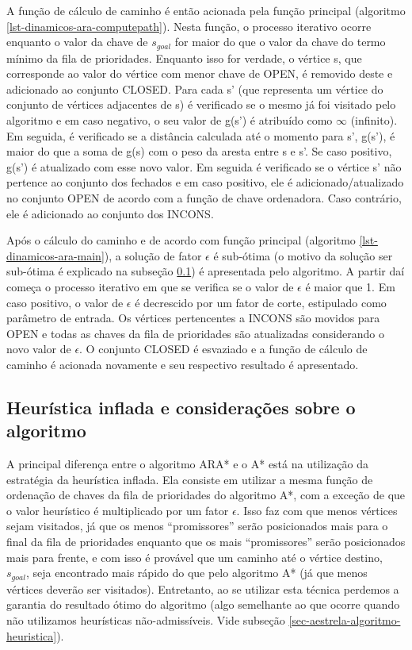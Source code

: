 A função de cálculo de caminho é então acionada pela função principal (algoritmo \ref{lst-dinamicos-ara-computepath}). Nesta função, o processo iterativo ocorre enquanto o valor da chave de $s_{goal}$ for maior do que o valor da chave do termo mínimo da fila de prioridades. Enquanto isso for verdade, o vértice s, que corresponde ao valor do vértice com menor chave de OPEN, é removido deste e adicionado ao conjunto CLOSED. Para cada s' (que representa um vértice do conjunto de vértices adjacentes de s) é verificado se o mesmo já foi visitado pelo algoritmo e em caso negativo, o seu valor de g(s') é atribuído como $\infty$ (infinito). Em seguida, é verificado se a distância calculada até o momento para s', g(s'), é maior do que a soma de g(s) com o peso da aresta entre s e s'. Se caso positivo, g(s') é atualizado com esse novo valor. Em seguida é verificado se o vértice s' não pertence ao conjunto dos fechados e em caso positivo, ele é adicionado/atualizado no conjunto OPEN de acordo com a função de chave ordenadora. Caso contrário, ele é adicionado ao conjunto dos INCONS.

Após o cálculo do caminho e de acordo com função principal (algoritmo \ref{lst-dinamicos-ara-main}), a solução de fator $\epsilon$ é sub-ótima (o motivo da solução ser sub-ótima é explicado na subseção \ref{sec-dinamicos-ara-consideracoes}) é apresentada pelo algoritmo. A partir daí começa o processo iterativo em que se verifica se o valor de $\epsilon$ é maior que 1. Em caso positivo, o valor de $\epsilon$ é decrescido por um fator de corte, estipulado como parâmetro de entrada. Os vértices pertencentes a INCONS são movidos para OPEN e todas as chaves da fila de prioridades são atualizadas considerando o novo valor de $\epsilon$. O conjunto CLOSED é esvaziado e a função de cálculo de caminho é acionada novamente e seu respectivo resultado é apresentado.

\subsection{Heurística inflada e considerações sobre o algoritmo}
\label{sec-dinamicos-ara-consideracoes}

A principal diferença entre o algoritmo ARA* e o A* está na utilização da estratégia da heurística inflada. Ela consiste em utilizar a mesma função de ordenação de chaves da fila de prioridades do algoritmo A*, com a exceção de que o valor heurístico é multiplicado por um fator $\epsilon$. Isso faz com que menos vértices sejam visitados, já que os menos ``promissores'' serão posicionados mais para o final da fila de prioridades enquanto que os mais ``promissores'' serão posicionados mais para frente, e com isso é provável que um caminho até o vértice destino, $s_{goal}$, seja encontrado mais rápido do que pelo algoritmo A* (já que menos vértices deverão ser visitados). Entretanto, ao se utilizar esta técnica perdemos a garantia do resultado ótimo do algoritmo (algo semelhante ao que ocorre quando não utilizamos heurísticas não-admissíveis. Vide subseção \ref{sec-aestrela-algoritmo-heuristica}).


